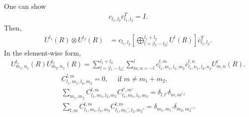 \documentclass[onecolumn,11pt]{IEEEtran}
\newcommand{\bracket}[1]{\ensuremath{\left[ #1 \right]}}
\begin{document}
One can show
\begin{align}
    c_{l_1,l_2} \overline{c}_{l_1,l_2}^T = I.
\end{align}
Then, 
\begin{align}
    U^{l_1}(R) \otimes U^{l_2}(R) & = c_{l_1,l_2} \bracket{ \bigoplus_{l=|l_1-l_2|}^{l_1+l_2} U^l(R) } \overline{c}_{l_1,l_2}^T.
\end{align}
In the element-wise form,
\begin{align}
    U^{l_1}_{m_1,n_1} (R) U^{l_2}_{m_2,n_2}(R) = \sum_{l=|l_1-l_2|}^{l_1+l_2} \sum_{m,n=-l}^l c^{l,m}_{l_1,m_1,l_2,m_2} \overline{c}^{l,n}_{l_1,n_1,l_2,n_2} U^{l}_{m,n}(R).
\end{align}
\begin{gather*}
    C^{l,m}_{l_1,m_1,l_2,m_2} = 0,\quad \text{ if } m \neq m_1 + m_2,\\
    \sum_{m_1,m_2} C^{l,m}_{l_1,m_1,l_2,m_2} C^{l',m'}_{l_1,m_1,l_2,m_2} = \delta_{l,l'}\delta_{m,m'},\\
    \sum_{l,m} C^{l,m}_{l_1,m_1,l_2,m_2} C^{l,m}_{l_1,m_1',l_2,m_2'} = \delta_{m_1,m_1'}\delta_{m_2,m_2'}.
\end{gather*}


\end{document}
